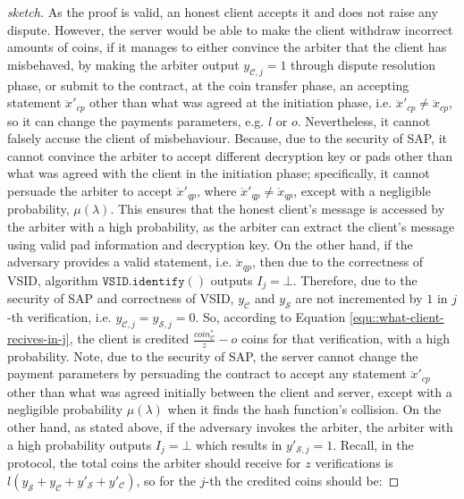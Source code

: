 \begin{proof}[sketch]
    
As the proof is valid, an honest client accepts it and does not raise any dispute. However, the server  would be able to make the client  withdraw incorrect amounts of coins, if it manages to either convince the arbiter that the client has misbehaved, by making the arbiter output  $y_{\scriptscriptstyle\mathcal {C},j}=1$ through dispute resolution phase, or submit to the contract, at the coin transfer phase,  an accepting  statement $\ddot{x}'_{\scriptscriptstyle cp}$ other than what was agreed at the initiation phase, i.e. $\ddot{x}'_{\scriptscriptstyle cp}\neq\ddot{x}_{\scriptscriptstyle cp}$, so it can change the payments parameters, e.g. $l$ or $o$. Nevertheless, it cannot falsely accuse the client of misbehaviour. Because,  due to the security of SAP, it cannot  convince the arbiter to accept different decryption key or pads other than what was agreed with the client in the initiation phase; specifically, it cannot persuade the arbiter to accept  $\ddot{x}'_{\scriptscriptstyle qp}$, where $\ddot{x}'_{\scriptscriptstyle qp}\neq \ddot{x}_{\scriptscriptstyle qp}$, except with a negligible probability, $\mu(\lambda)$. This ensures that the honest client's message is accessed by  the arbiter with a high probability, as the arbiter can extract the client's message using valid pad information and decryption key.  On the other hand, if the adversary provides a valid statement, i.e. $\ddot{x}_{\scriptscriptstyle qp}$, then due to the correctness of VSID, algorithm $\mathtt{VSID.identify}()$ outputs $I_{\scriptscriptstyle j}=\bot$. Therefore, due to the security of SAP and correctness of VSID,   $y_{\scriptscriptstyle\mathcal {C}}$ and $y_{\scriptscriptstyle\mathcal {S}}$ are not incremented by $1$  in $j$-th verification, i.e. $y_{\scriptscriptstyle\mathcal{C},j}=y_{\scriptscriptstyle\mathcal{S},j}=0$. So, according to Equation \ref{equ::what-client-recives-in-j}, the client is credited $\frac{coin_{\scriptscriptstyle\mathcal C}^{\scriptscriptstyle*}}{z}-o$ coins for that verification, with a high probability. Note,  due to the security of SAP, the server cannot change the payment parameters by persuading the contract to accept any statement $\ddot{x}'_{\scriptscriptstyle cp}$ other than what was agreed initially between the client and server, except with a negligible probability $\mu(\lambda)$ when it finds the hash function's collision. On the other hand, as stated above, if the adversary invokes the arbiter, the arbiter with a high probability outputs $I_{\scriptscriptstyle j}=\bot$ which results in $y'_{\scriptscriptstyle\mathcal{S},j}=1$. Recall, in the protocol, the total coins the arbiter should receive for $z$ verifications is $l(y_{\scriptscriptstyle\mathcal S}+y_{\scriptscriptstyle\mathcal C}+y'_{\scriptscriptstyle\mathcal S}+y'_{\scriptscriptstyle\mathcal C})$, so for the $j$-th the credited coins should be: 
     

\end{proof}
